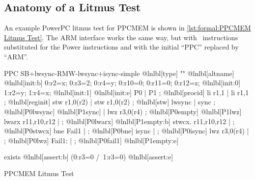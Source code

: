 \subsection{Anatomy of a Litmus Test}
\label{sec:formal:Anatomy of a Litmus Test}

An example PowerPC litmus test for PPCMEM is shown in
\cref{lst:formal:PPCMEM Litmus Test}.
The ARM interface works the same way, but with \ARM\ instructions
substituted for the Power instructions and with the initial ``PPC''
replaced by ``ARM''.

\begin{listing}[tbp]
\begin{fcvlabel}
\begin{VerbatimL}[commandchars=\@\[\]]
PPC SB+lwsync-RMW-lwsync+isync-simple		@lnlbl[type]
""						@lnlbl[altname]
{						@lnlbl[init:b]
0:r2=x; 0:r3=2; 0:r4=y; 0:r10=0; 0:r11=0; 0:r12=z; @lnlbl[init:0]
1:r2=y; 1:r4=x;					@lnlbl[init:1]
}						@lnlbl[init:e]
 P0                 | P1           ;		@lnlbl[procid]
 li r1,1            | li r1,1      ;		@lnlbl[reginit]
 stw r1,0(r2)       | stw r1,0(r2) ;		@lnlbl[stw]
 lwsync             | sync         ; @lnlbl[P0lwsync] @lnlbl[P1sync]
                    | lwz r3,0(r4) ; @lnlbl[P0empty]  @lnlbl[P1lwz]
 lwarx  r11,r10,r12 | ;		@lnlbl[P0lwarx] @lnlbl[P1empty:b]
 stwcx. r11,r10,r12 | ;		@lnlbl[P0stwcx]
 bne Fail1          | ;		@lnlbl[P0bne]
 isync              | ;		@lnlbl[P0isync]
 lwz r3,0(r4)       | ;		@lnlbl[P0lwz]
 Fail1:             | ;		@lnlbl[P0fail1] @lnlbl[P1empty:e]

exists						@lnlbl[assert:b]
(0:r3=0 /\ 1:r3=0)				@lnlbl[assert:e]
\end{VerbatimL}
\end{fcvlabel}
\caption{PPCMEM Litmus Test}
\label{lst:formal:PPCMEM Litmus Test}
\end{listing}

